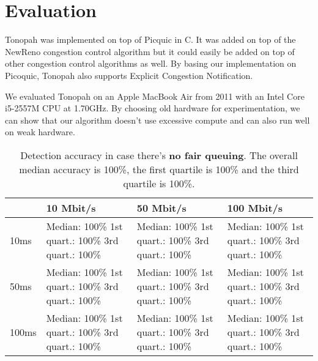 \documentclass[conference]{IEEEtran}
\begin{document}
\section{Evaluation}

Tonopah was implemented on top of Picquic in C. It was added on top of the NewReno congestion control algorithm but it could easily be added on top of other 
congestion control algorithms as well. By basing our implementation on Picoquic, Tonopah also supports Explicit Congestion Notification. 

We evaluated Tonopah on an Apple MacBook Air from 2011 with an Intel Core i5-2557M CPU at 1.70GHz. 
By choosing old hardware for experimentation, we can show that our algorithm doesn't use excessive compute and can also run well on weak hardware. 

\begin{table}
\begin{tabularx}{\columnwidth}{| l | X | X | X |}
\hline
& 10 Mbit/s & 50 Mbit/s & 100 Mbit/s \\ \hline
10ms & Median: 100\% \newline 1st quart.: 100\% \newline 3rd quart.: 100\% & Median: 100\% \newline 1st quart.: 100\% \newline 3rd quart.: 100\% & Median: 100\% \newline 1st quart.: 100\% \newline 3rd quart.: 100\%\\ \hline
50ms & Median: 100\% \newline 1st quart.: 100\% \newline 3rd quart.: 100\% & Median: 100\% \newline 1st quart.: 100\% \newline 3rd quart.: 100\% & Median: 100\% \newline 1st quart.: 100\% \newline 3rd quart.: 100\% \\ \hline
100ms & Median: 100\% \newline 1st quart.: 100\% \newline 3rd quart.: 100\% & Median: 100\% \newline 1st quart.: 100\% \newline 3rd quart.: 100\% & Median: 100\% \newline 1st quart.: 100\% \newline 3rd quart.: 100\% \\ \hline
\end{tabularx}
\caption{Detection accuracy in case there's \textbf{no fair queuing}.  The overall median accuracy is 100\%, the first quartile is 100\% and the third quartile is 100\%.}
\label{table:no_fq}
\end{table}
\end{document}
